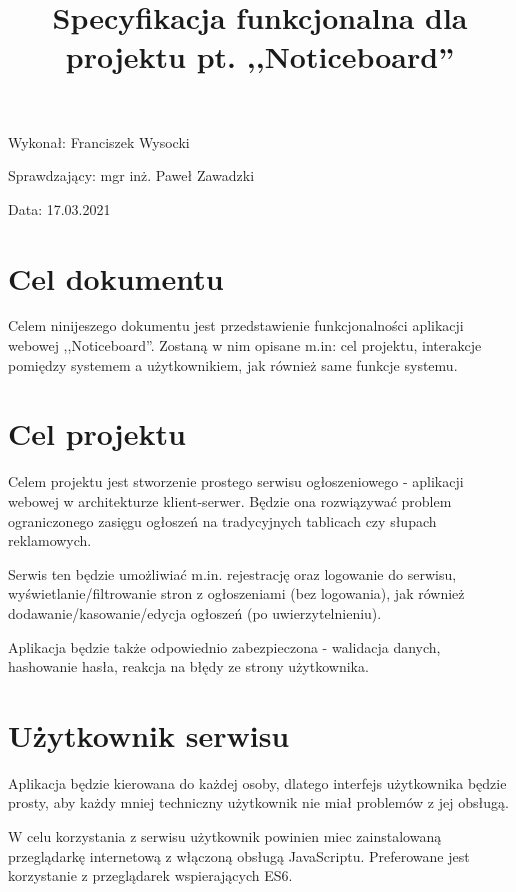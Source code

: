 \documentclass{article}
\title{Specyfikacja funkcjonalna dla projektu pt. ,,Noticeboard''}
\author{}
\date{}
\begin{document}
\maketitle

\begin{flushright}
\par
\vfill
\par
{\fontsize{11}{11}\selectfont
    Wykonał: Franciszek Wysocki

    Sprawdzający: mgr inż. Paweł Zawadzki

    Data: 17.03.2021
}
\end{flushright}
\thispagestyle{empty}

\newpage

\tableofcontents

\newpage

\section{Cel dokumentu}
{\fontsize{12}{12}\selectfont
    Celem ninijeszego dokumentu jest przedstawienie funkcjonalności aplikacji webowej ,,Noticeboard''. Zostaną w nim opisane m.in: cel projektu, interakcje pomiędzy systemem a użytkownikiem, jak również same funkcje systemu.
}


\section{Cel projektu}
{\fontsize{12}{12}\selectfont
    Celem projektu jest stworzenie prostego serwisu ogłoszeniowego - aplikacji webowej w architekturze klient-serwer. Będzie ona rozwiązywać problem ograniczonego zasięgu ogłoszeń na tradycyjnych tablicach czy słupach reklamowych.
    
    Serwis ten będzie umożliwiać m.in. rejestrację oraz logowanie do serwisu, wyświetlanie/filtrowanie stron z ogłoszeniami (bez logowania), jak również dodawanie/kasowanie/edycja ogłoszeń (po uwierzytelnieniu). 
    
    Aplikacja będzie także odpowiednio zabezpieczona - walidacja danych, hashowanie hasła, reakcja na błędy ze strony użytkownika.
}

\section{Użytkownik serwisu}

{\fontsize{12}{12}\selectfont
    Aplikacja będzie kierowana do każdej osoby, dlatego interfejs użytkownika będzie prosty, aby każdy mniej techniczny użytkownik nie miał problemów z jej obsługą. 
    
    W celu korzystania z serwisu użytkownik powinien miec zainstalowaną przeglądarkę internetową z włączoną obsługą JavaScriptu. Preferowane jest korzystanie z przeglądarek wspierających ES6.
}
\end{document}
